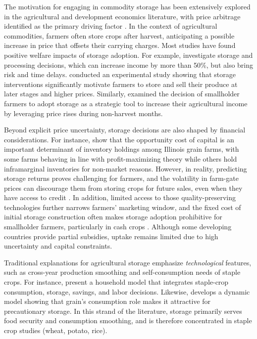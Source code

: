 \noindent The motivation for engaging in commodity storage has been extensively explored in the agricultural and development economics literature, with price arbitrage identified as the primary driving factor \citep{helmberger1977welfare, wright1984welfare, deaton1992behaviour, miranda1996, wright1982econ, minten2014new, nindi2024incentive}. In the context of agricultural commodities, farmers often store crops after harvest, anticipating a possible increase in price that offsets their carrying charges. Most studies have found positive welfare impacts of storage adoption. For example, \cite{ruhinduka2020smallholder} investigate storage and processing decisions, which can increase income by more than 50\%, but also bring risk and time delays. \cite{aggarwal2018grain} conducted an experimental study showing that storage interventions significantly motivate farmers to store and sell their produce at later stages and higher prices. Similarly, \cite{priya2020post} examined the decision of smallholder farmers to adopt storage as a strategic tool to increase their agricultural income by leveraging price rises during non-harvest months.

Beyond explicit price uncertainty, storage decisions are also shaped by financial considerations. For instance, \cite{janzen2024commodity} show that the opportunity cost of capital is an important determinant of inventory holdings among Illinois grain farms, with some farms behaving in line with profit-maximizing theory while others hold inframarginal inventories for non-market reasons. However, in reality, predicting storage returns proves challenging for farmers, and the volatility in farm-gate prices can discourage them from storing crops for future sales, even when they have access to credit \citep{cardell2023price}. In addition, limited access to those quality-preserving technologies further narrows farmers' marketing window, and the fixed cost of initial storage construction often makes storage adoption prohibitive for smallholder farmers, particularly in cash crops \citep{aggarwal2018grain}. Although some developing countries provide partial subsidies, uptake remains limited due to high uncertainty and capital constraints.

Traditional explanations for agricultural storage emphasize \textit{technological} features, such as cross-year production smoothing and self-consumption needs of staple crops. For instance, \cite{saha1994household} present a household model that integrates staple-crop consumption, storage, savings, and labor decisions. Likewise, \cite{park2006risk} develops a dynamic model showing that grain's consumption role makes it attractive for precautionary storage. In this strand of the literature, storage primarily serves food security and consumption smoothing, and is therefore concentrated in staple crop studies (wheat, potato, rice).



